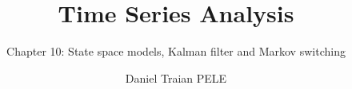 \title[Time Series Analysis]{Time Series Analysis}
\subtitle{Chapter 10: State space models, Kalman filter and Markov switching}
\author[D.T. Pele]{Daniel Traian PELE}
\date{}

\providecommand{\tsaapplink}[3]{\hypertarget{#2}{}\hyperlink{#1}{\beamergotobutton{#3}}}  %
\providecommand{\tsaappback}[2]{\begin{tikzpicture}[remember picture,overlay]\node[anchor=south east] at ([xshift=-3mm,yshift=7mm]current page.south east){\hyperlink{#1}{\beamerreturnbutton{#2}}};\end{tikzpicture}}  %
\providecommand{\tsachlink}[2]{\href{#1}{#2}}  %
\providecommand{\tsachlinkt}[2]{\href{#1}{\usebeamercolor[fg]{frametitle}#2}}  %


